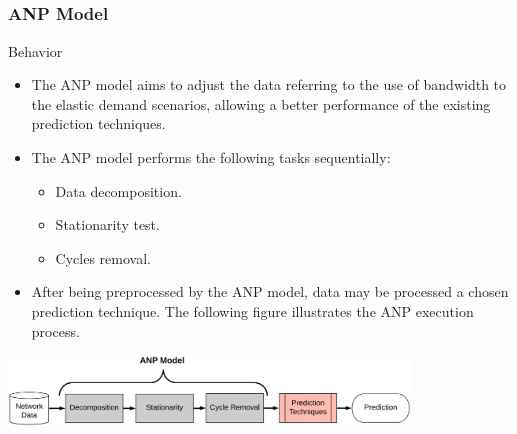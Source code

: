 \documentclass[aspectratio=169]{beamer}
\begin{document}
\subsection{}
\begin{frame}
\frametitle{ANP Model}
\begin{block}{Behavior}
    \begin{itemize}\small
    \item The ANP model aims to adjust the data referring to the use of bandwidth to the elastic demand scenarios, allowing a better performance of the existing prediction techniques.
    \item The ANP model performs the following tasks sequentially:
    \begin{itemize}[triangle]
        \item Data decomposition.
        \item Stationarity test. 
        \item Cycles removal.
    \end{itemize}
    \item After being preprocessed by the ANP model, data may be processed a chosen prediction technique. The following figure illustrates the ANP execution process.
    \end{itemize}
\end{block}

\centering
\includegraphics[width=0.8\textwidth,angle=0]{ANPModel.png}

\end{frame}


\end{document}
